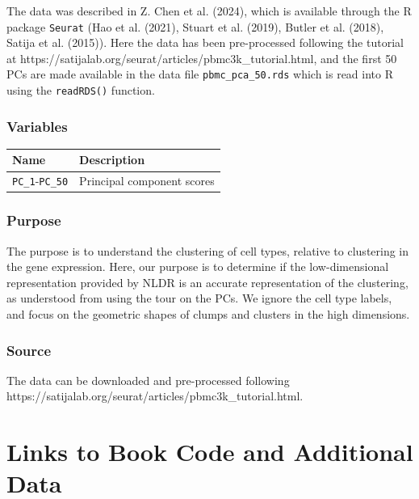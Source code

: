 \documentclass[
  letterpaper,
]{krantz}
\begin{document}
The data was described in Z. Chen et al. (2024), which is available
through the R package \texttt{Seurat} (Hao et al. (2021), Stuart et al.
(2019), Butler et al. (2018), Satija et al. (2015)). Here the data has
been pre-processed following the tutorial at
https://satijalab.org/seurat/articles/pbmc3k\_tutorial.html, and the
first 50 PCs are made available in the data file
\texttt{pbmc\_pca\_50.rds} which is read into R using the
\texttt{readRDS()} function.

\subsection*{Variables}\label{variables-12}

\begin{longtable}[]{@{}ll@{}}
\toprule\noalign{}
Name & Description \\
\midrule\noalign{}
\endhead
\bottomrule\noalign{}
\endlastfoot
\texttt{PC\_1}-\texttt{PC\_50} & Principal component scores \\
\end{longtable}

\subsection*{Purpose}\label{purpose-12}

The purpose is to understand the clustering of cell types, relative to
clustering in the gene expression. Here, our purpose is to determine if
the low-dimensional representation provided by NLDR is an accurate
representation of the clustering, as understood from using the tour on
the PCs. We ignore the cell type labels, and focus on the geometric
shapes of clumps and clusters in the high dimensions.

\subsection*{Source}\label{source-12}

The data can be downloaded and pre-processed following
https://satijalab.org/seurat/articles/pbmc3k\_tutorial.html.

\chapter{Links to Book Code and Additional Data}\label{book-data}
\end{document}
